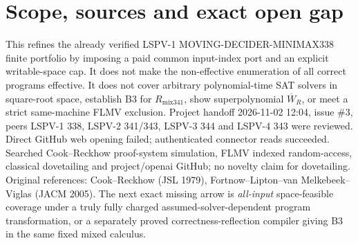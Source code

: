 \documentclass[11pt]{article}
\begin{document}
\section*{Scope, sources and exact open gap}
This refines the already verified LSPV-1 MOVING-DECIDER-MINIMAX338 finite portfolio by imposing a paid common input-index port and an explicit writable-space cap. It does not make the non-effective enumeration of all correct programs effective. It does not cover arbitrary polynomial-time SAT solvers in square-root space, establish B3 for $R_{\mathrm{mix341}}$, show superpolynomial $\overline W_R$, or meet a strict same-machine FLMV exclusion. Project handoff 2026-11-02 12:04, issue \#3, peers LSPV-1 338, LSPV-2 341/343, LSPV-3 344 and LSPV-4 343 were reviewed. Direct GitHub web opening failed; authenticated connector reads succeeded. Searched Cook--Reckhow proof-system simulation, FLMV indexed random-access, classical dovetailing and project/openai GitHub; no novelty claim for dovetailing. Original references: Cook--Reckhow (JSL 1979), Fortnow--Lipton--van Melkebeek--Viglas (JACM 2005). The next exact missing arrow is \emph{all-input} space-feasible coverage under a truly fully charged assumed-solver-dependent program transformation, or a separately proved correctness-reflection compiler giving B3 in the same fixed mixed calculus.
\end{document}
